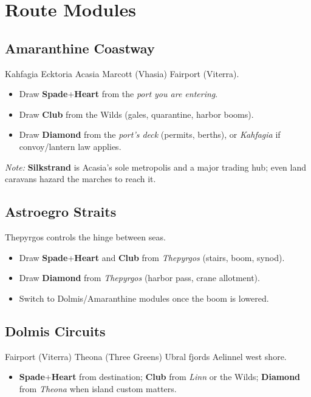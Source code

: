 \documentclass[11pt]{article}
\newcommand{\SuitSpade}{\textbf{Spade}} %
\newcommand{\SuitHeart}{\textbf{Heart}} %
\newcommand{\SuitClub}{\textbf{Club}}   %
\newcommand{\SuitDiamond}{\textbf{Diamond}} %
\begin{document}
\section{Route Modules}
\subsection{Amaranthine Coastway}
Kahfagia \textrightarrow{} Ecktoria \textrightarrow{} Acasia \textrightarrow{} Marcott (Vhasia) \textrightarrow{} Fairport (Viterra).
\begin{itemize}
  \item Draw \SuitSpade{}+\SuitHeart{} from the \emph{port you are entering}.
  \item Draw \SuitClub{} from the Wilds (gales, quarantine, harbor booms).
  \item Draw \SuitDiamond{} from the \emph{port's deck} (permits, berths), or \emph{Kahfagia} if convoy/lantern law applies.
\end{itemize}
\emph{Note:} \textbf{Silkstrand} is Acasia's sole metropolis and a major trading hub; even land caravans hazard the marches to reach it.

\subsection{Astroegro Straits}
Thepyrgos controls the hinge between seas.
\begin{itemize}
  \item Draw \SuitSpade{}+\SuitHeart{} and \SuitClub{} from \emph{Thepyrgos} (stairs, boom, synod).
  \item Draw \SuitDiamond{} from \emph{Thepyrgos} (harbor pass, crane allotment).
  \item Switch to Dolmis/Amaranthine modules once the boom is lowered.
\end{itemize}

\subsection{Dolmis Circuits}
Fairport (Viterra) \textrightarrow{} Theona (Three Greens) \textrightarrow{} Ubral fjords \textrightarrow{} Aelinnel west shore.
\begin{itemize}
  \item \SuitSpade{}+\SuitHeart{} from destination; \SuitClub{} from \emph{Linn} or the Wilds; \SuitDiamond{} from \emph{Theona} when island custom matters.
\end{itemize}
\end{document}
